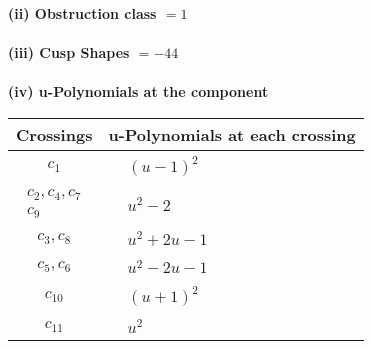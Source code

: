 \documentclass[1p]{elsarticle_modified}
\theoremstyle{definition}
\begin{document}
\flushleft \textbf{(ii) Obstruction class $= 1$}\\~\\
\flushleft \textbf{(iii) Cusp Shapes $= -44$}\\~\\
\newpage\renewcommand{\arraystretch}{1}
\flushleft \textbf{(iv) u-Polynomials at the component}\newline \\
\begin{tabular}{m{50pt}|m{274pt}}
Crossings & \hspace{64pt}u-Polynomials at each crossing \\
\hline $$\begin{aligned}c_{1}\end{aligned}$$&$\begin{aligned}
&(u-1)^2
\end{aligned}$\\
\hline $$\begin{aligned}c_{2},c_{4},c_{7}\\c_{9}\end{aligned}$$&$\begin{aligned}
&u^2-2
\end{aligned}$\\
\hline $$\begin{aligned}c_{3},c_{8}\end{aligned}$$&$\begin{aligned}
&u^2+2 u-1
\end{aligned}$\\
\hline $$\begin{aligned}c_{5},c_{6}\end{aligned}$$&$\begin{aligned}
&u^2-2 u-1
\end{aligned}$\\
\hline $$\begin{aligned}c_{10}\end{aligned}$$&$\begin{aligned}
&(u+1)^2
\end{aligned}$\\
\hline $$\begin{aligned}c_{11}\end{aligned}$$&$\begin{aligned}
&u^2
\end{aligned}$\\
\hline
\end{tabular}\\~\\
\end{document}
